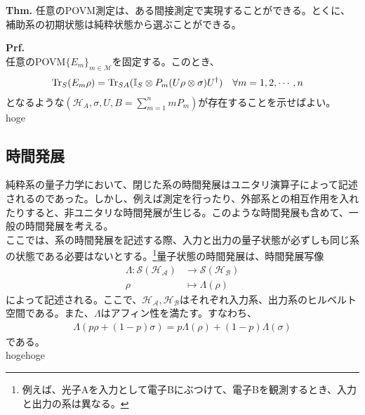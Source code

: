 \documentclass[a4paper,11pt]{jsarticle}
\numberwithin{equation}{section}
\begin{document}
\begin{itembox}[l]{\textbf{Thm.}}
    任意のPOVM測定は、ある間接測定で実現することができる。とくに、補助系の初期状態は純粋状態から選ぶことができる。
\end{itembox}
\textbf{Prf.}\\
任意のPOVM$\{E_m\}_{m \in \mathcal{M}}$を固定する。このとき、
\begin{align}
    \Tr_{S}(E_m\rho) &= \Tr_{SA}(\mathbb{I}_S \otimes P_m (U \rho \otimes \sigma)U^\dagger) \quad \forall m =1,2,\cdots,n
\end{align}
となるような$(\mathcal{H}_A, \sigma, U,B = \sum_{m=1}^n mP_m)$が存在することを示せばよい。\\
hoge

\subsection{時間発展}
純粋系の量子力学において、閉じた系の時間発展はユニタリ演算子によって記述されるのであった。しかし、例えば測定を行ったり、外部系との相互作用を入れたりすると、非ユニタリな時間発展が生じる。このような時間発展も含めて、一般の時間発展を考える。\\
ここでは、系の時間発展を記述する際、入力と出力の量子状態が必ずしも同じ系の状態である必要はないとする。\footnote{例えば、光子Aを入力として電子Bにぶつけて、電子Bを観測するとき、入力と出力の系は異なる。}量子状態の時間発展は、時間発展写像
\begin{align}
    \Lambda : \mathcal{S}(\mathcal{H_A}) &\to \mathcal{S}(\mathcal{H_B})\\
    \rho &\mapsto \Lambda(\rho)
\end{align}
によって記述される。ここで、$\mathcal{H_A}, \mathcal{H_B}$はそれぞれ入力系、出力系のヒルベルト空間である。また、$\Lambda$はアフィン性を満たす。すなわち、
\begin{align}
    \Lambda(p\rho + (1-p)\sigma) = p\Lambda(\rho) + (1-p)\Lambda(\sigma)
\end{align}
である。\\
hogehoge


\end{document}
